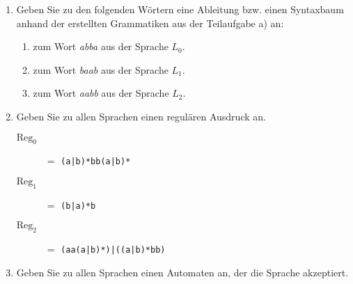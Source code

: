 \documentclass{bschlangaul-aufgabe}
\begin{document}
\begin{enumerate}

\item Geben Sie zu den folgenden Wörtern eine Ableitung bzw. einen
Syntaxbaum anhand der erstellten Grammatiken aus der Teilaufgabe a) an:

\begin{enumerate}
\item zum Wort \emph{abba} aus der Sprache $L_0$.

\begin{bAntwort}
\end{bAntwort}

\item zum Wort \emph{baab} aus der Sprache $L_1$.

\begin{bAntwort}
\end{bAntwort}

\item zum Wort \emph{aabb} aus der Sprache $L_2$.

\begin{bAntwort}
\end{bAntwort}
\end{enumerate}


\item Geben Sie zu allen Sprachen einen regulären Ausdruck an.

\begin{bAntwort}
\begin{description}
\item[$\text{Reg}_0$] $=$ \texttt{(a|b)*bb(a|b)*}

\item[$\text{Reg}_1$] $=$ \texttt{(b|a)*b}

\item[$\text{Reg}_2$] $=$ \texttt{(aa(a|b)*)|((a|b)*bb)}
\end{description}
\end{bAntwort}


\item Geben Sie zu allen Sprachen einen Automaten an, der die Sprache
akzeptiert.

\begin{description}


\end{description}
\end{enumerate}
\end{document}
